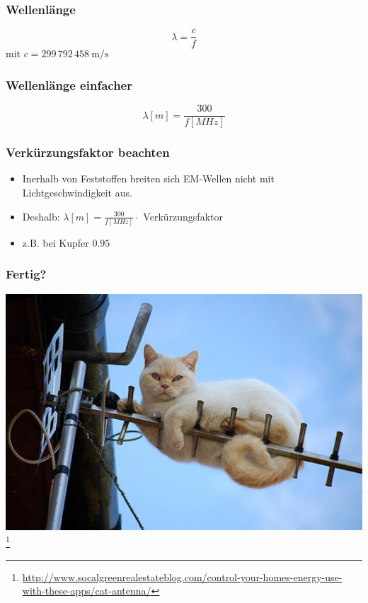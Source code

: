 \begin{frame}
    \frametitle{Wellenlänge}
    \begin{center} \huge
        $$\lambda = \frac{c}{f}$$
      	mit $c = 299\,792\,458 ~ \mathrm{m/s}$
	\end{center}
\end{frame}

\begin{frame}
    \frametitle{Wellenlänge einfacher}
    \begin{center} \huge
        $$\lambda [m] = \frac{300}{f[MHz]}$$
	\end{center}
\end{frame}


\begin{frame}
    \frametitle{Verkürzungsfaktor beachten}
    \begin{center}
	\begin{itemize} \Large
		\item Inerhalb von Feststoffen breiten sich EM-Wellen nicht mit Lichtgeschwindigkeit aus.
		\item Deshalb: $\lambda[m] = \frac{300}{f[MHz]} \cdot $ Verkürzungsfaktor
		\item z.B. bei Kupfer $0.95$
    \end{itemize}
    \end{center}
\end{frame}

\begin{frame}
    \frametitle{Fertig?}
    \begin{center}
        \includegraphics[width=.8\textwidth]{e11/cat-antenna.jpg}
        \footnote{\tiny \url{http://www.socalgreenrealestateblog.com/control-your-homes-energy-use-with-these-apps/cat-antenna/}}
	\end{center}
\end{frame}


